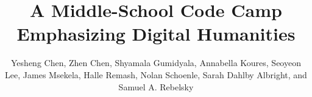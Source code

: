 \documentclass[sigconf]{acmart}
\begin{document}
\title{A Middle-School Code Camp Emphasizing Digital Humanities}

\author{Yesheng Chen, Zhen Chen, Shyamala Gumidyala, Annabella Koures, Seoyeon Lee, James Msekela, Halle Remash, Nolan Schoenle, Sarah Dahlby Albright, and Samuel A. Rebelsky}

\renewcommand{\shortauthors}{Chen \textit{et al.}}





\maketitle

\newcommand{\college}{Grinnell}






 
\end{document}
